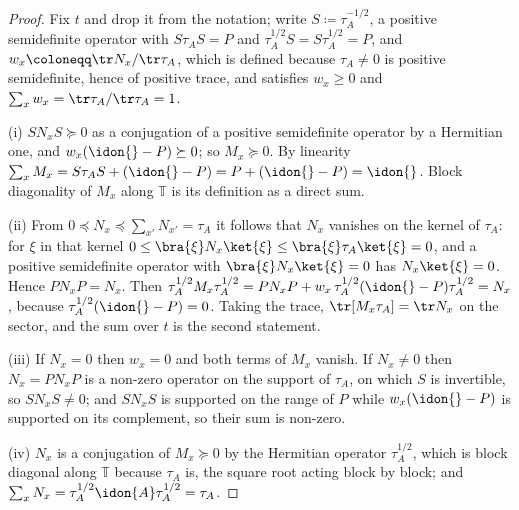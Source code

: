 \begin{proof}
Fix $t$ and drop it from the notation; write $S\coloneqq\tau_A^{-1/2}$, a
positive semidefinite operator with $S\tau_AS=P$ and
$\tau_A^{1/2}S=S\tau_A^{1/2}=P$, and $w_x\coloneqq\tr N_x/\tr\tau_A$, which
is defined because $\tau_A\ne0$ is positive semidefinite, hence of positive
trace, and satisfies $w_x\ge0$ and $\sum_xw_x=\tr\tau_A/\tr\tau_A=1$.

(i) $SN_xS\succeq0$ as a conjugation of a positive semidefinite operator by
a Hermitian one, and $w_x(\idon{}-P)\succeq0$; so $M_x\succeq0$. By
linearity $\sum_xM_x=S\tau_AS+(\idon{}-P)=P+(\idon{}-P)=\idon{}$. Block
diagonality of $M_x$ along $\mathbb{T}$ is its definition as a direct sum.

(ii) From $0\preceq N_x\preceq\sum_{x'}N_{x'}=\tau_A$ it follows that
$N_x$ vanishes on the kernel of $\tau_A$: for $\xi$ in that kernel
$0\le\bra{\xi}N_x\ket{\xi}\le\bra{\xi}\tau_A\ket{\xi}=0$, and a positive
semidefinite operator with $\bra{\xi}N_x\ket{\xi}=0$ has $N_x\ket{\xi}=0$.
Hence $PN_xP=N_x$. Then
$\tau_A^{1/2}M_x\tau_A^{1/2}=PN_xP+w_x\,\tau_A^{1/2}(\idon{}-P)\tau_A^{1/2}
=N_x$, because $\tau_A^{1/2}(\idon{}-P)=0$. Taking the trace,
$\tr[M_x\tau_A]=\tr N_x$ on the sector, and the sum over $t$ is the second
statement.

(iii) If $N_x=0$ then $w_x=0$ and both terms of $M_x$ vanish. If $N_x\ne0$
then $N_x=PN_xP$ is a non-zero operator on the support of $\tau_A$, on which
$S$ is invertible, so $SN_xS\ne0$; and $SN_xS$ is supported on the range of
$P$ while $w_x(\idon{}-P)$ is supported on its complement, so their sum is
non-zero.

(iv) $N_x$ is a conjugation of $M_x\succeq0$ by the Hermitian operator
$\tau_A^{1/2}$, which is block diagonal along $\mathbb{T}$ because
$\tau_A$ is, the square root acting block by block; and
$\sum_xN_x=\tau_A^{1/2}\idon{A}\tau_A^{1/2}=\tau_A$.
\end{proof}

